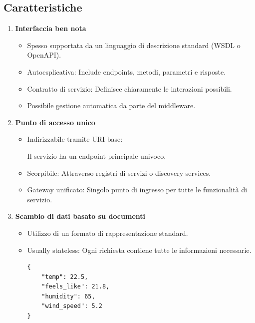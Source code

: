 \subsection{Caratteristiche}
\begin{enumerate}
    \item \textbf{Interfaccia ben nota}
        \begin{itemize}
            \item Spesso supportata da un linguaggio di descrizione standard (WSDL o OpenAPI).
            \item Autoesplicativa: Include endpoints, metodi, parametri e risposte.
            \item Contratto di servizio: Definisce chiaramente le interazioni possibili.
            \item Possibile gestione automatica da parte del middleware.
        \end{itemize}
    \item \textbf{Punto di accesso unico}
        \begin{itemize}
            \item Indirizzabile tramite URI base:

            Il servizio ha un endpoint principale univoco.
            \item Scorpibile: Attraverso registri di servizi o discovery services.
            \item Gateway unificato: Singolo punto di ingresso per tutte le funzionalità di servizio.
        \end{itemize}
    \item \textbf{Scambio di dati basato su documenti}
        \begin{itemize}
            \item Utilizzo di un formato di rappresentazione standard.
            \item Usually stateless: Ogni richiesta contiene tutte le informazioni necessarie.
            \begin{tcolorbox}[breakable, title={Esempio: Risposta JSON da OpenWeatherMap API}]
                \begin{lstlisting}
{
    "temp": 22.5,
    "feels_like": 21.8,
    "humidity": 65,
    "wind_speed": 5.2
}
                \end{lstlisting}
            \end{tcolorbox}
        \end{itemize}
\end{enumerate}

